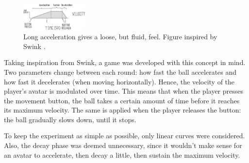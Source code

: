 \begin{figure}[htbp]
\centering
\includegraphics[width=0.30\textwidth]{Pics/adsr_loose}
\caption{Long acceleration gives a loose, but fluid, feel. Figure inspired by Swink \cite{swink}.}
\label{fig:adsr_loose}
\end{figure}

Taking inspiration from Swink, a game was developed with this concept in mind. Two parameters change between each round: how fast the ball accelerates and how fast it decelerates (when moving horizontally). Hence, the velocity of the player's avatar is modulated over time. This means that when the player presses the movement button, the ball takes a certain amount of time before it reaches its maximum velocity. The same is applied when the player releases the button: the ball gradually slows down, until it stops.

To keep the experiment as simple as possible, only linear curves were considered. Also, the decay phase was deemed unnecessary, since it wouldn't make sense for an avatar to accelerate, then decay a little, then sustain the maximum velocity.


